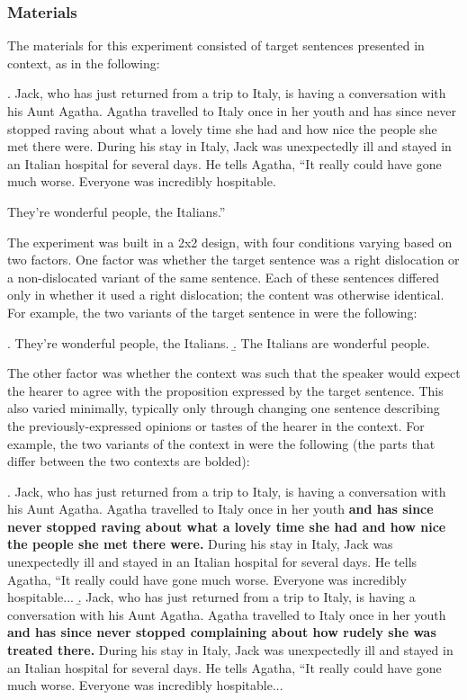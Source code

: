 \documentclass[titlepage,12pt]{article}
\begin{document}
\subsubsection{Materials}

The materials for this experiment consisted of target sentences presented in context, as in the following: 

\ex. Jack, who has just returned from a trip to Italy, is having a conversation with his Aunt Agatha. Agatha travelled to Italy once in her youth and has since never stopped raving about what a lovely time she had and how nice the people she met there were. During his stay in Italy, Jack was unexpectedly ill and stayed in an Italian hospital for several days. He tells Agatha, ``It really could have gone much worse. Everyone was incredibly hospitable.
        \begin{center}They're wonderful people, the Italians.''\end{center}

The experiment was built in a 2x2 design, with four conditions varying based on two factors. One factor %
was whether the target sentence was a right dislocation or a non-dislocated variant of the same sentence. Each of these sentences differed only in whether it used a right dislocation; the content was otherwise identical. For example, the two variants of the target sentence in \Last were the following:

    \a. They're wonderful people, the Italians.
    \b. The Italians are wonderful people.

The other factor was whether the context was such that the speaker would expect the hearer to agree with the proposition expressed by the target sentence. This also varied minimally, typically only through changing one sentence describing the previously-expressed opinions or tastes of the hearer in the context. For example, the two variants of the context in \Last were the following (the parts that differ between the two contexts are bolded):

\a. Jack, who has just returned from a trip to Italy, is having a conversation with his Aunt Agatha. Agatha travelled to Italy once in her youth \textbf{and has since never stopped raving about what a lovely time she had and how nice the people she met there were.} During his stay in Italy, Jack was unexpectedly ill and stayed in an Italian hospital for several days. He tells Agatha, ``It really could have gone much worse. Everyone was incredibly hospitable...
\b. Jack, who has just returned from a trip to Italy, is having a conversation with his Aunt Agatha. Agatha travelled to Italy once in her youth \textbf{and has since never stopped complaining about how rudely she was treated there.} During his stay in Italy, Jack was unexpectedly ill and stayed in an Italian hospital for several days. He tells Agatha, ``It really could have gone much worse. Everyone was incredibly hospitable...
\end{document}
